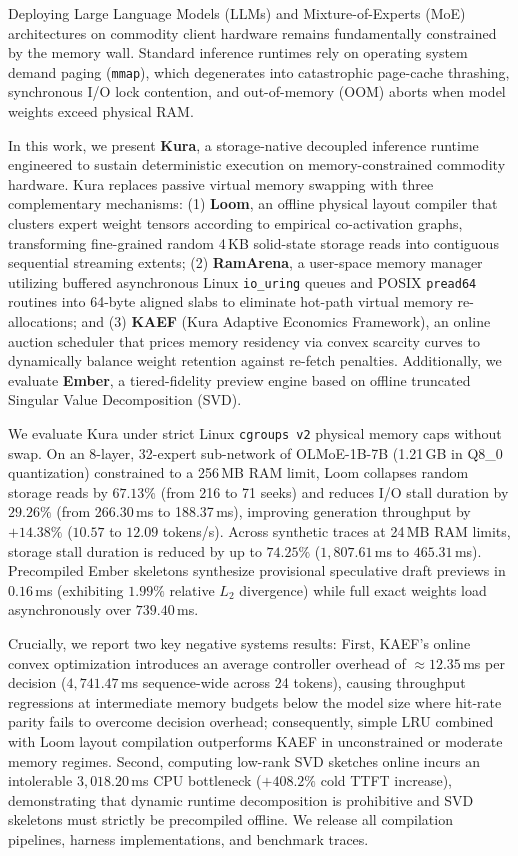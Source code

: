 Deploying Large Language Models (LLMs) and Mixture-of-Experts (MoE) architectures on commodity client hardware remains fundamentally constrained by the memory wall. Standard inference runtimes rely on operating system demand paging (\texttt{mmap}), which degenerates into catastrophic page-cache thrashing, synchronous I/O lock contention, and out-of-memory (OOM) aborts when model weights exceed physical RAM. 

In this work, we present \textbf{Kura}, a storage-native decoupled inference runtime engineered to sustain deterministic execution on memory-constrained commodity hardware. Kura replaces passive virtual memory swapping with three complementary mechanisms: 
(1) \textbf{Loom}, an offline physical layout compiler that clusters expert weight tensors according to empirical co-activation graphs, transforming fine-grained random 4\,KB solid-state storage reads into contiguous sequential streaming extents; 
(2) \textbf{RamArena}, a user-space memory manager utilizing buffered asynchronous Linux \texttt{io\_uring} queues and POSIX \texttt{pread64} routines into 64-byte aligned slabs to eliminate hot-path virtual memory re-allocations; and 
(3) \textbf{KAEF} (Kura Adaptive Economics Framework), an online auction scheduler that prices memory residency via convex scarcity curves to dynamically balance weight retention against re-fetch penalties. 
Additionally, we evaluate \textbf{Ember}, a tiered-fidelity preview engine based on offline truncated Singular Value Decomposition (SVD).

We evaluate Kura under strict Linux \texttt{cgroups v2} physical memory caps without swap. On an 8-layer, 32-expert sub-network of OLMoE-1B-7B (1.21\,GB in Q8\_0 quantization) constrained to a 256\,MB RAM limit, Loom collapses random storage reads by $67.13\%$ (from 216 to 71 seeks) and reduces I/O stall duration by $29.26\%$ (from 266.30\,ms to 188.37\,ms), improving generation throughput by $+14.38\%$ ($10.57$ to $12.09$ tokens/s). Across synthetic traces at 24\,MB RAM limits, storage stall duration is reduced by up to $74.25\%$ ($1,807.61$\,ms to $465.31$\,ms). Precompiled Ember skeletons synthesize provisional speculative draft previews in $0.16$\,ms (exhibiting $1.99\%$ relative $L_2$ divergence) while full exact weights load asynchronously over $739.40$\,ms. 

Crucially, we report two key negative systems results: 
First, KAEF's online convex optimization introduces an average controller overhead of $\approx 12.35$\,ms per decision ($4,741.47$\,ms sequence-wide across 24 tokens), causing throughput regressions at intermediate memory budgets below the model size where hit-rate parity fails to overcome decision overhead; consequently, simple LRU combined with Loom layout compilation outperforms KAEF in unconstrained or moderate memory regimes. 
Second, computing low-rank SVD sketches online incurs an intolerable $3,018.20$\,ms CPU bottleneck ($+408.2\%$ cold TTFT increase), demonstrating that dynamic runtime decomposition is prohibitive and SVD skeletons must strictly be precompiled offline. 
We release all compilation pipelines, harness implementations, and benchmark traces.
